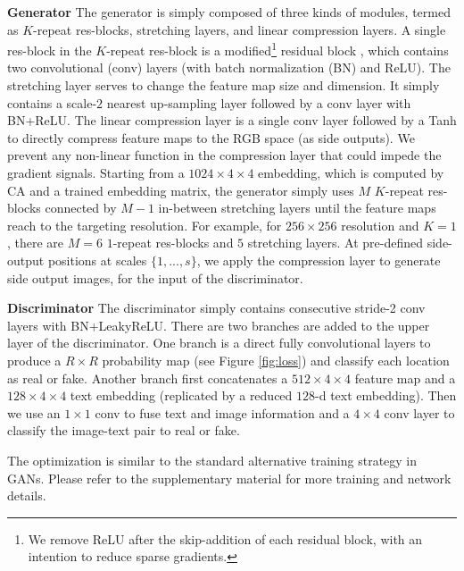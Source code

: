 \documentclass[10pt,twocolumn,letterpaper]{article}
\begin{document}
\textbf{Generator} The generator is simply composed of three kinds of modules, termed as $K$-repeat res-blocks, stretching layers, and linear compression layers.
A single res-block in the $K$-repeat res-block is a modified\footnote{We remove ReLU after the skip-addition of each residual block, with an intention to reduce sparse gradients.} residual block \cite{he2016identity}, which contains two convolutional (conv) layers (with batch normalization (BN) \cite{ioffe2015batch} and ReLU). The stretching layer serves to change the feature map size and dimension. It simply contains a scale-$2$ nearest up-sampling layer followed by a conv layer with BN+ReLU. The linear compression layer is a single conv layer followed by a Tanh to directly compress feature maps to the RGB space (as side outputs). We prevent any non-linear function in the compression layer that could impede the gradient signals. 
Starting from a $1024{\times}4{\times}4$ embedding, which is computed by CA and a trained embedding matrix, the generator simply uses $M$ $K$-repeat res-blocks connected by $M{-}1$ in-between stretching layers until the feature maps reach to the targeting resolution. 
For example, for $256{\times}256$ resolution and $K{=}1$, there are $M{=}6$ $1$-repeat res-blocks and $5$ stretching layers. 
At pre-defined side-output positions at scales $\{1,...,s\}$, we apply the compression layer to generate side output images, for the input of the discriminator. 

\textbf{Discriminator} The discriminator simply contains consecutive stride-2 conv layers with BN+LeakyReLU. There are two branches are added to the upper layer of the discriminator. One branch is a direct fully convolutional layers to produce a $R{\times}R$ probability map (see Figure \ref{fig:loss}) and classify each location as real or fake. 
Another branch first concatenates a $512{\times}4{\times}4$ feature map and a $128{\times}4{\times}4$ text embedding (replicated by a reduced $128$-d text embedding). Then we use an $1{\times}1$ conv to fuse text and image information and a $4{\times}4$ conv layer to classify the image-text pair to real or fake.

The optimization is similar to the standard alternative training strategy in GANs. Please refer to the supplementary material for more training and network details.
\end{document}
